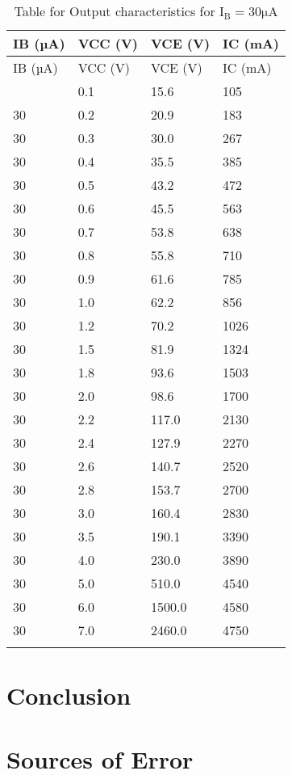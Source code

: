 \documentclass[12pt]{article}
\begin{document}
\begin{longtable}{|l|l|l|l|}
	\hline
    IB (µA) & VCC (V) & VCE (V) & IC (mA) \\ \hline
	\endfirsthead
	\hline
    IB (µA) & VCC (V) & VCE (V) & IC (mA) \\ \hline
	\endhead
	\hline
	\endfoot
	\endlastfoot
    30  & 0.1  & 15.6  & 105  \\ \hline
    30  & 0.2  & 20.9  & 183  \\ \hline
    30  & 0.3  & 30.0  & 267  \\ \hline
    30  & 0.4  & 35.5  & 385  \\ \hline
    30  & 0.5  & 43.2  & 472  \\ \hline
    30  & 0.6  & 45.5  & 563  \\ \hline
    30  & 0.7  & 53.8  & 638  \\ \hline
    30  & 0.8  & 55.8  & 710  \\ \hline
    30  & 0.9  & 61.6  & 785  \\ \hline
    30  & 1.0  & 62.2  & 856  \\ \hline
    30  & 1.2  & 70.2  & 1026 \\ \hline
    30  & 1.5  & 81.9  & 1324 \\ \hline
    30  & 1.8  & 93.6  & 1503 \\ \hline
    30  & 2.0  & 98.6  & 1700 \\ \hline
    30  & 2.2  & 117.0 & 2130 \\ \hline
    30  & 2.4  & 127.9 & 2270 \\ \hline
    30  & 2.6  & 140.7 & 2520 \\ \hline
    30  & 2.8  & 153.7 & 2700 \\ \hline
    30  & 3.0  & 160.4 & 2830 \\ \hline
    30  & 3.5  & 190.1 & 3390 \\ \hline
    30  & 4.0  & 230.0 & 3890 \\ \hline
    30  & 5.0  & 510.0 & 4540 \\ \hline
    30  & 6.0  & 1500.0 & 4580 \\ \hline
    30  & 7.0  & 2460.0 & 4750 \\ \hline
\caption{Table for Output characteristics for $\mathrm{I_B=30 \mu A}$}
\end{longtable}


\section{Conclusion}
\section{Sources of Error}
 
\end{document}
